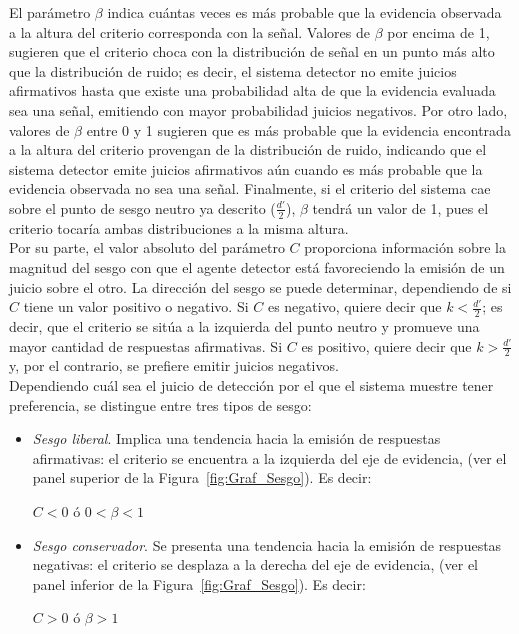 \begin{itemize}
El parámetro $\beta$ indica cuántas veces es más probable que la evidencia observada a la altura del criterio corresponda con la señal. Valores de $\beta$ por encima de 1, sugieren que el criterio choca con la distribución de señal en un punto más alto que la distribución de ruido; es decir, el sistema detector no emite juicios afirmativos hasta que existe una probabilidad alta de que la evidencia evaluada sea una señal, emitiendo con mayor probabilidad juicios negativos. Por otro lado, valores de $\beta$ entre 0 y 1 sugieren que es más probable que la evidencia encontrada a la altura del criterio provengan de la distribución de ruido, indicando que el sistema detector emite juicios afirmativos aún cuando es más probable que la evidencia observada no sea una señal. Finalmente, si el criterio del sistema cae sobre el punto de sesgo neutro ya descrito ($\frac{d'}{2}$), $\beta$ tendrá un valor de 1, pues el criterio tocaría ambas distribuciones a la misma altura.\\

Por su parte, el valor absoluto del parámetro $C$ proporciona información sobre la magnitud del sesgo con que el agente detector está favoreciendo la emisión de un juicio sobre el otro. La dirección del sesgo se puede determinar, dependiendo de si $C$ tiene un valor positivo o negativo. Si $C$ es negativo, quiere decir que $k < \frac{d'}{2}$; es decir, que el criterio se sitúa a la izquierda del punto neutro y promueve una mayor cantidad de respuestas afirmativas. Si $C$ es positivo, quiere decir que $k > \frac{d'}{2}$ y, por el contrario, se prefiere emitir juicios negativos.\\

Dependiendo cuál sea el juicio de detección por el que el sistema muestre tener preferencia, se distingue entre tres tipos de sesgo:\\

\begin{itemize}
\item \textsl{Sesgo liberal}. Implica una tendencia hacia la emisión de respuestas afirmativas: el criterio se encuentra a la izquierda del eje de evidencia, (ver el panel superior de la Figura~\ref{fig:Graf_Sesgo}). Es decir: \\
\begin{center}
$C < 0$ \qquad ó \qquad $0 < \beta < 1$\\
\end{center}

\item \textsl{Sesgo conservador}. Se presenta una tendencia hacia la emisión de respuestas negativas: el criterio se desplaza a la derecha del eje de evidencia, (ver el panel inferior de la Figura~\ref{fig:Graf_Sesgo}). Es decir: \\
\begin{center}
$C > 0$ \qquad ó \qquad $\beta > 1$\\
\end{center}


\end{itemize}
\end{itemize}
